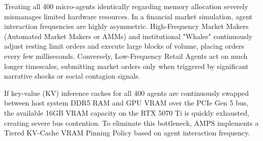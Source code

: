 Treating all 400 micro-agents identically regarding memory allocation severely mismanages limited hardware resources. In a financial market simulation, agent interaction frequencies are highly asymmetric. High-Frequency Market Makers (Automated Market Makers or AMMs) and institutional "Whales" continuously adjust resting limit orders and execute large blocks of volume, placing orders every few milliseconds. Conversely, Low-Frequency Retail Agents act on much longer timescales, submitting market orders only when triggered by significant narrative shocks or social contagion signals.

If key-value (KV) inference caches for all 400 agents are continuously swapped between host system DDR5 RAM and GPU VRAM over the PCIe Gen 5 bus, the available 16GB VRAM capacity on the RTX 5070 Ti is quickly exhausted, creating severe bus contention. To eliminate this bottleneck, AMPS implements a Tiered KV-Cache VRAM Pinning Policy based on agent interaction frequency.

